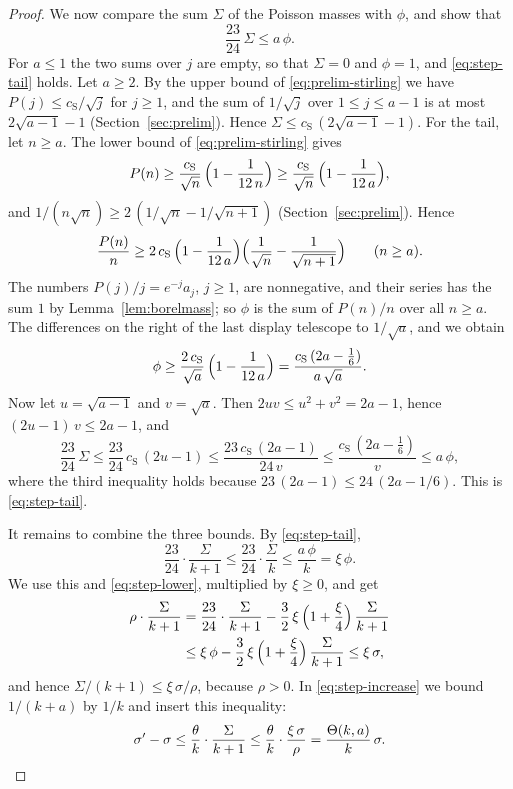 \documentclass{amsart}
\theoremstyle{definition}
\theoremstyle{remark}
\numberwithin{equation}{section}
\begin{document}
\begin{proof}
We now compare the sum $\Sigma$ of the Poisson masses with $\phi$, and show
that
\begin{equation}\label{eq:step-tail}
\frac{23}{24}\,\Sigma\le a\,\phi .
\end{equation}
For $a\le1$ the two sums over $j$ are empty, so that $\Sigma=0$ and
$\phi=1$, and \eqref{eq:step-tail} holds. Let $a\ge2$. By
the upper bound of \eqref{eq:prelim-stirling} we have
$P(j)\le c_{\mathrm S}/\sqrt j$ for $j\ge1$, and the sum of
$1/\sqrt j$ over $1\le j\le a-1$ is at most $2\sqrt{a-1}-1$
(Section~\ref{sec:prelim}). Hence
$\Sigma\le c_{\mathrm S}\,(2\sqrt{a-1}-1)$. For the tail, let $n\ge a$.
The lower bound of \eqref{eq:prelim-stirling} gives
\[
P(n)\ge\frac{c_{\mathrm S}}{\sqrt n}\,\Bigl(1-\frac{1}{12\,n}\Bigr)
\ge\frac{c_{\mathrm S}}{\sqrt n}\,\Bigl(1-\frac{1}{12\,a}\Bigr),
\]
and $1/(n\sqrt n)\ge2\,(1/\sqrt n-1/\sqrt{n+1})$
(Section~\ref{sec:prelim}). Hence
\[
\frac{P(n)}{n}\ge2\,c_{\mathrm S}\,\Bigl(1-\frac{1}{12\,a}\Bigr)
\Bigl(\frac{1}{\sqrt n}-\frac{1}{\sqrt{n+1}}\Bigr)\qquad(n\ge a).
\]
The numbers $P(j)/j=e^{-j}a_j$, $j\ge1$, are nonnegative, and their series
has the sum $1$ by Lemma~\ref{lem:borelmass}; so $\phi$ is the sum of
$P(n)/n$ over all $n\ge a$. The differences on the right of the last
display telescope to $1/\sqrt a$, and we obtain
\[
\phi\ge\frac{2\,c_{\mathrm S}}{\sqrt a}\,\Bigl(1-\frac{1}{12\,a}\Bigr)
=\frac{c_{\mathrm S}\,(2a-\frac16)}{a\,\sqrt a}.
\]
Now let $u=\sqrt{a-1}$ and $v=\sqrt a$. Then $2uv\le u^2+v^2=2a-1$, hence
$(2u-1)\,v\le2a-1$, and
\[
\frac{23}{24}\,\Sigma\le\frac{23}{24}\,c_{\mathrm S}\,(2u-1)
\le\frac{23\,c_{\mathrm S}\,(2a-1)}{24\,v}
\le\frac{c_{\mathrm S}\,(2a-\frac16)}{v}\le a\,\phi ,
\]
where the third inequality holds because $23\,(2a-1)\le24\,(2a-1/6)$. This
is \eqref{eq:step-tail}.

It remains to combine the three bounds. By \eqref{eq:step-tail},
\[
\frac{23}{24}\cdot\frac{\Sigma}{k+1}\le\frac{23}{24}\cdot\frac{\Sigma}{k}
\le\frac{a\,\phi}{k}=\xi\,\phi .
\]
We use this and \eqref{eq:step-lower}, multiplied by $\xi\ge0$, and get
\begin{align*}
\rho\cdot\frac{\Sigma}{k+1}
&=\frac{23}{24}\cdot\frac{\Sigma}{k+1}
-\frac32\,\xi\,\Bigl(1+\frac{\xi}{4}\Bigr)\,\frac{\Sigma}{k+1}\\
&\le\xi\,\phi-\frac32\,\xi\,\Bigl(1+\frac{\xi}{4}\Bigr)\,\frac{\Sigma}{k+1}
\le\xi\,\sigma ,
\end{align*}
and hence $\Sigma/(k+1)\le\xi\,\sigma/\rho$, because $\rho>0$. In
\eqref{eq:step-increase} we bound $1/(k+a)$ by $1/k$ and insert this
inequality:
\[
\sigma'-\sigma\le\frac{\theta}{k}\cdot\frac{\Sigma}{k+1}
\le\frac{\theta}{k}\cdot\frac{\xi\,\sigma}{\rho}
=\frac{\Theta(k,a)}{k}\,\sigma . \qedhere
\]
\end{proof}
\end{document}
